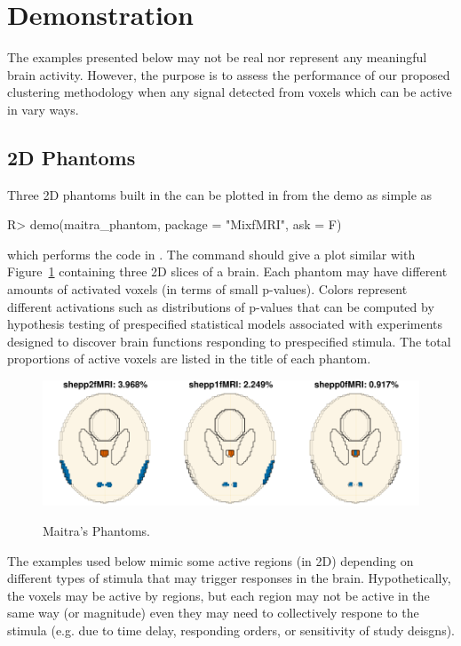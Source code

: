 \section[Demonstration]{Demonstration}
\label{sec:demonstrations}
The examples presented below may not be real nor represent any meaningful
brain activity. However, the purpose is to assess the performance
of our proposed clustering methodology when any signal detected from
voxels which can be active in vary ways.


\subsection[2D Phantoms]{2D Phantoms}
\label{sec:phantoms}

Three 2D phantoms built in the  can be plotted in 
from the demo as simple as
\begin{Code}[title=Maitra's Phantoms]
R> demo(maitra_phantom, package = "MixfMRI", ask = F)
\end{Code}
which performs the code in .
The 
command should give a plot similar with Figure~\ref{fig:maitra_phantom}
containing three 2D slices of a brain.
Each phantom may have different amounts of
activated voxels (in terms of small p-values).
Colors represent different activations
such as distributions of p-values that can be computed by hypothesis testing
of prespecified statistical models associated with experiments designed
to discover brain functions responding to prespecified stimula.
The total proportions of active voxels are listed in the title of
each phantom.
\begin{figure}[h]
\caption{Maitra's Phantoms.}
\centering
\vspace{0.2cm}
\includegraphics[width=6in]{./MixfMRI-include/maitra_phantom}
\label{fig:maitra_phantom}
\end{figure}

The examples used below mimic some active regions (in 2D)
depending on different types of stimula that may trigger responses
in the brain.
Hypothetically, the voxels may be active by regions, but
each region may not be active in the same way (or magnitude) even they may need
to collectively respone to the stimula (e.g. due to time delay,
responding orders, or sensitivity of study deisgns).

